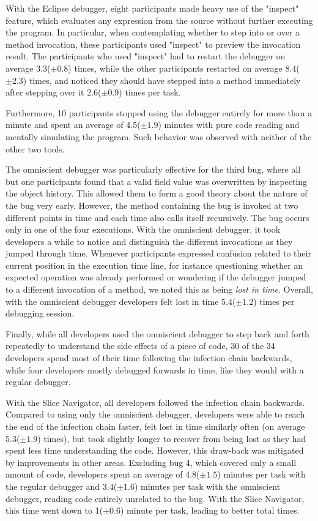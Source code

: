 With the Eclipse debugger, eight participants made heavy use of the "inspect" feature, which evaluates any expression from the source without further executing the program.
In particular, when contemplating whether to step into or over a method invocation, these participants used "inspect" to preview the invocation result.
The participants who used "inspect" had to restart the debugger on average 3.3($\pm0.8$) times, while the other participants restarted on average 8.4($\pm2.3$) times, and noticed they should have stepped into a method immediately after stepping over it 2.6($\pm0.9$) times per task.

Furthermore, 10 participants stopped using the debugger entirely for more than a minute and spent an average of 4.5($\pm1.9$) minutes with pure code reading and mentally simulating the program.
Such behavior was observed with neither of the other two tools.

The omniscient debugger was particularly effective for the third bug, where all but one participants found that a valid field value was overwritten by inspecting the object history.
This allowed them to form a good theory about the nature of the bug very early.
However, the method containing the bug is invoked at two different points in time and each time also calls itself recursively.
The bug occurs only in one of the four executions.
With the omniscient debugger, it took developers a while to notice and distinguish the different invocations as they jumped through time.
Whenever participants expressed confusion related to their current position in the execution time line,
for instance questioning whether an expected operation was already performed or wondering if the debugger jumped to a different invocation of a method, we noted this as being \emph{lost in time}.
Overall, with the omniscient debugger developers felt lost in time 5.4($\pm1.2$) times per debugging session.

Finally, while all developers used the omniscient debugger to step back and forth repeatedly to understand the side effects of a piece of code, 30 of the 34 developers spend most of their time following the infection chain backwards, while four developers mostly debugged forwards in time, like they would with a regular debugger.

With the Slice Navigator, all developers followed the infection chain backwards.
Compared to using only the omniscient debugger, developers were able to reach the end of the infection chain faster, felt lost in time similarly often (on average 5.3($\pm1.9$) times), but took slightly longer to recover from being lost as they had spent less time understanding the code.
However, this draw-back was mitigated by improvements in other areas.
Excluding bug 4, which covered only a small amount of code, developers spent an average of 4.8($\pm1.5$) minutes per task with the regular debugger and 3.4($\pm1.6$) minutes per task with the omniscient debugger, reading code entirely unrelated to the bug.
With the Slice Navigator, this time went down to 1($\pm0.6$) minute per task, leading to better total times.

